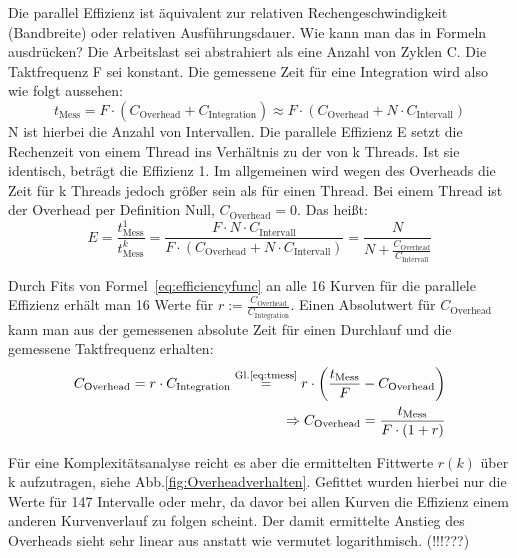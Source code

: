 \documentclass[12pt,a4paper]{article}
\begin{document}
Die parallel Effizienz ist äquivalent zur relativen Rechengeschwindigkeit (Bandbreite) oder relativen Ausführungsdauer. Wie kann man das in Formeln ausdrücken? Die Arbeitslast sei abstrahiert als eine Anzahl von Zyklen C. Die  Taktfrequenz F sei konstant. Die gemessene Zeit für eine Integration wird also wie folgt aussehen:
\begin{equation}
	\label{eq:tmess}
	 t_\text{Mess} = F \cdot \left( C_\text{Overhead} + C_\text{Integration} \right) \approx  F \cdot \left( C_\text{Overhead} +N\cdot C_\text{Intervall} \right)
\end{equation}
N ist hierbei die Anzahl von Intervallen. Die parallele Effizienz E setzt die Rechenzeit von einem Thread ins Verhältnis zu der von k Threads. Ist sie identisch, beträgt die Effizienz 1. Im allgemeinen wird wegen des Overheads die Zeit für k Threads jedoch größer sein als für einen Thread. Bei einem Thread ist der Overhead per Definition Null, $C_\text{Overhead}=0$. Das heißt:
\begin{equation}
	\label{eq:efficiencyfunc}
	E = \frac{t_\text{Mess}^1}{t_\text{Mess}^k} = \frac{ F \cdot N\cdot C_\text{Intervall} }{ F \cdot ( C_\text{Overhead} +N\cdot C_\text{Intervall} ) } = \frac{ N }{ N + \frac{ C_\text{Overhead} }{ C_\text{Intervall} } }
\end{equation}

Durch Fits von Formel~\ref{eq:efficiencyfunc} an alle 16 Kurven für die parallele Effizienz erhält man 16 Werte für $r:=\frac{C_\text{Overhead}}{C_\text{Integration}}$. Einen Absolutwert für $C_\text{Overhead}$ kann man aus der gemessenen absolute Zeit für einen Durchlauf und die gemessene Taktfrequenz erhalten:
\begin{eqnarray}
	C_\text{Overhead} = r \cdot C_\text{Integration} \overset{\text{Gl.\ref{eq:tmess}}}{=} r \cdot \left( \frac{t_\text{Mess}}{F} - C_\text{Overhead} \right)\\
	\Rightarrow C_\text{Overhead} = \frac{t_\text{Mess}}{F\cdot (1+r)}
\end{eqnarray}

Für eine Komplexitätsanalyse reicht es aber die ermittelten Fittwerte $r(k)$ über k aufzutragen, siehe Abb.\ref{fig:Overheadverhalten}. Gefittet wurden hierbei nur die Werte für 147 Intervalle oder mehr, da davor bei allen Kurven die Effizienz einem anderen Kurvenverlauf zu folgen scheint. Der damit ermittelte Anstieg des Overheads sieht sehr linear aus anstatt wie vermutet logarithmisch. (!!!???)\\
\end{document}
